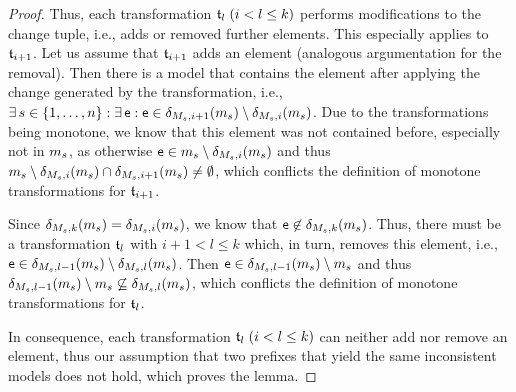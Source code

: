 \begin{proof}
    Thus, each transformation $\mathfrak{t}_{l} \; (i < l \leq k)$ performs modifications to the change tuple, i.e., adds or removed further elements.
    This especially applies to $\mathfrak{t}_{i+1}$.
    Let us assume that $\mathfrak{t}_{i+1}$ adds an element (analogous argumentation for the removal).
    Then there is a model that contains the element after applying the change generated by the transformation, i.e., $\exists s \in \setted{1, \dots, n} : \exists \modelelement{e} : \modelelement{e} \in \change{\metamodel{M}{s},i+1}(\model{m}{s}) \setminus \change{\metamodel{M}{s},i}(\model{m}{s})$.
    Due to the transformations being monotone, we know that this element was not contained before, especially not in $m_{s}$, as otherwise $\textsf{e} \in m_{s} \setminus \delta_{M_{s},i}(m_{s})$ and thus $m_{s} \setminus \delta_{M_{s},i}(m_{s}) \cap \delta_{M_{s},i+1}(m_{s}) \neq \emptyset$, which conflicts the definition of monotone transformations for $\mathfrak{t}_{i+1}$.

    Since $\delta_{M_{s},k}(m_{s}) = \delta_{M_{s},i}(m_{s})$, we know that $\textsf{e} \not\in \delta_{M_{s},k}(m_{s})$.
    Thus, there must be a transformation $\mathfrak{t}_{l}$ with $i+1 < l \leq k$ which, in turn, removes this element, i.e., $\textsf{e} \in \delta_{M_{s},l-1}(m_{s}) \setminus \delta_{M_{s},l}(m_{s})$.
    Then $\textsf{e} \in \delta_{M_{s},l-1}(m_{s}) \setminus m_{s}$ and thus $\delta_{M_{s},l-1}(m_{s}) \setminus m_{s} \not\subseteq \delta_{M_{s},l}(m_{s})$, which conflicts the definition of monotone transformations for $\mathfrak{t}_{l}$.

    In consequence, each transformation $\mathfrak{t}_{l} \; (i < l \leq k)$ can neither add nor remove an element, thus our assumption that two prefixes that yield the same inconsistent models does not hold, which proves the lemma.
\end{proof}

